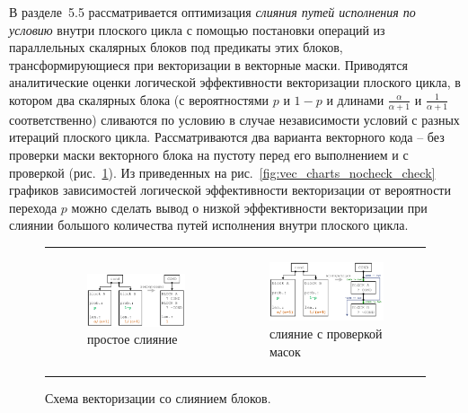 \documentclass[a4paper,14pt]{extarticle}                     %
\theoremstyle{plain}                                         %
\begin{document}

В разделе~5.5 рассматривается оптимизация \textit{слияния путей исполнения по условию} внутри плоского цикла с помощью постановки операций из параллельных скалярных блоков под предикаты этих блоков, трансформирующиеся при векторизации в векторные маски.
Приводятся аналитические оценки логической эффективности векторизации плоского цикла, в котором два скалярных блока (с вероятностями $p$ и $1 - p$ и длинами $\frac{\alpha}{\alpha + 1}$ и $\frac{1}{\alpha + 1}$ соответственно) сливаются по условию в случае независимости условий с разных итераций плоского цикла.
Рассматриваются два варианта векторного кода -- без проверки маски векторного блока на пустоту перед его выполнением и с проверкой (рис.~\ref{fig:vec_ifconv_nocheck_check}).
Из приведенных на рис.~\ref{fig:vec_charts_nocheck_check} графиков зависимостей логической эффективности векторизации от вероятности перехода $p$ можно сделать вывод о низкой эффективности векторизации при слиянии большого количества путей исполнения внутри плоского цикла.

\begin{figure}[!ht]
\centering
\begin{tabular}{ll}
\begin{subfigure}{0.45\textwidth}\centering\includegraphics[width=0.85\columnwidth]{./fig/vec_ifconv_nocheck.pdf}\caption{простое слияние}\end{subfigure} &
\begin{subfigure}{0.45\textwidth}\centering\includegraphics[width=0.85\columnwidth]{./fig/vec_ifconv_check.pdf}\caption{слияние с проверкой масок}\end{subfigure}
\end{tabular}
\singlespacing
\caption{Схема векторизации со слиянием блоков.}
\label{fig:vec_ifconv_nocheck_check}
\end{figure}
\end{document}
